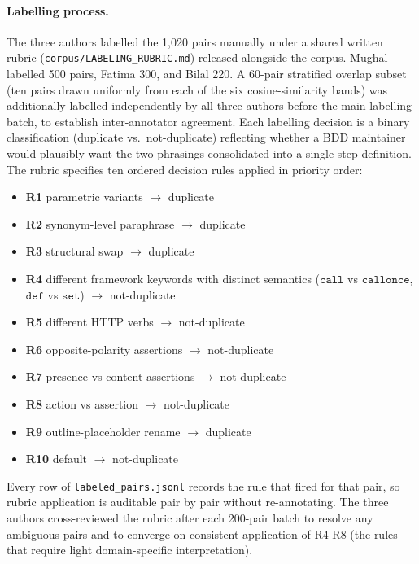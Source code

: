 \documentclass[11pt,a4paper]{article}
\begin{document}
\paragraph{Labelling process.} The three authors labelled the
1{,}020 pairs manually under a shared written rubric
(\texttt{corpus/LABELING\_RUBRIC.md}) released alongside the corpus.
Mughal labelled 500 pairs, Fatima 300, and Bilal 220. A 60-pair
stratified overlap subset (ten pairs drawn uniformly from each of
the six cosine-similarity bands) was additionally labelled
independently by all three authors before the main labelling batch,
to establish inter-annotator agreement. Each labelling decision is
a binary classification (duplicate vs.\ not-duplicate) reflecting
whether a BDD maintainer would plausibly want the two phrasings
consolidated into a single step definition. The rubric specifies
ten ordered decision rules applied in priority order:

\begin{itemize}[leftmargin=2em,itemsep=0pt,topsep=2pt]
\item \textbf{R1} parametric variants $\to$ duplicate
\item \textbf{R2} synonym-level paraphrase $\to$ duplicate
\item \textbf{R3} structural swap $\to$ duplicate
\item \textbf{R4} different framework keywords with distinct
      semantics ($\texttt{call}$ vs $\texttt{callonce}$,
      $\texttt{def}$ vs $\texttt{set}$) $\to$ not-duplicate
\item \textbf{R5} different HTTP verbs $\to$ not-duplicate
\item \textbf{R6} opposite-polarity assertions $\to$ not-duplicate
\item \textbf{R7} presence vs content assertions $\to$ not-duplicate
\item \textbf{R8} action vs assertion $\to$ not-duplicate
\item \textbf{R9} outline-placeholder rename $\to$ duplicate
\item \textbf{R10} default $\to$ not-duplicate
\end{itemize}

Every row of \texttt{labeled\_pairs.jsonl} records the rule that
fired for that pair, so rubric application is auditable pair by
pair without re-annotating. The three authors cross-reviewed the
rubric after each 200-pair batch to resolve any ambiguous pairs
and to converge on consistent application of R4-R8 (the rules that
require light domain-specific interpretation).
\end{document}
